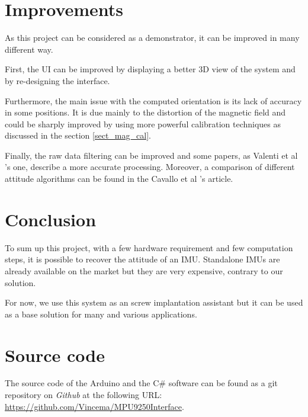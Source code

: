 \documentclass{article}
\begin{document}
\section{Improvements}

As this project can be considered as a demonstrator, it can be improved in many different way.

\vspace{\baselineskip}

First, the UI can be improved by displaying a better 3D view of the system and by re-designing the interface. 

\vspace{\baselineskip}

Furthermore, the main issue with the computed orientation is its lack of accuracy in some positions. It is due mainly to the distortion of the magnetic field and could be sharply improved by using more powerful calibration techniques as discussed in the section \ref{sect_mag_cal}.

\vspace{\baselineskip}

Finally, the raw data filtering can be improved and some papers, as Valenti et al \cite{valenti} 's one, describe a more accurate processing. Moreover, a comparison of different attitude algorithms can be found in the Cavallo et al 's \cite{cavallo} article.


\section{Conclusion}

To sum up this project, with a few hardware requirement and few computation steps, it is possible to recover the attitude of an IMU. Standalone IMUs are already available on the market but they are very expensive, contrary to our solution.

\vspace{\baselineskip}

For now, we use this system as an screw implantation assistant but it can be used as a base solution for many and various applications.

\section{Source code}

The source code of the Arduino and the C\# software can be found as a git repository on \textit{Github} at the following URL: \url{https://github.com/Vincema/MPU9250Interface}.



\end{document}
